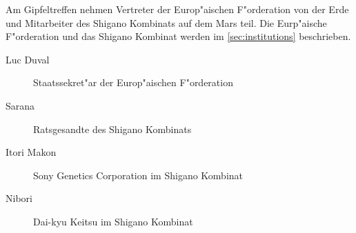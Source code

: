 
Am Gipfeltreffen nehmen Vertreter der Europ"aischen F"orderation von der Erde und Mitarbeiter des Shigano Kombinats auf dem
Mars teil. Die Eurp"aische F"orderation und das Shigano Kombinat werden im \cref{sec:institutions} beschrieben.

\begin{description}
    \item [Luc Duval] Staatssekret"ar der Europ"aischen F"orderation
    \item [Sarana] Ratsgesandte des Shigano Kombinats
    \item [Itori Makon] Sony Genetics Corporation im Shigano Kombinat
    \item [Nibori] Dai-kyu Keitsu im Shigano Kombinat
\end{description}
